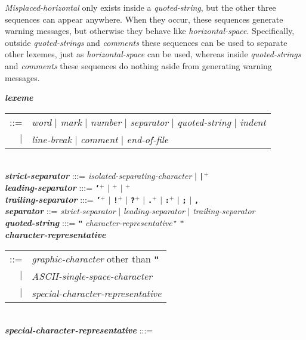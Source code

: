 \documentclass[12pt]{article}
\newcommand{\TT}[1]{{\tt \bfseries #1}}
\newcommand{\STAR}{{\Large $^\star$}}
\newcommand{\PLUS}[1][]{{$^{+#1}$}}
\newcommand{\emkey}[1]{{\em \bfseries #1}}
\newlength{\figurewidth}
\newenvironment{boxedfigure}[1][!btp]%
	{\begin{figure*}[#1]
	 \begin{lrbox}{\figurebox}
	 \begin{minipage}{\figurewidth}

	 \vspace*{1ex}}%
	{
	 \vspace*{1ex}

	 \end{minipage}
	 \end{lrbox}

	 \vspace*{-15ex}
	 \centering
	 \fbox{\hspace*{0.1in}\usebox{\figurebox}\hspace*{0.1in}}
	 \end{figure*}}
\newenvironment{indpar}[1][0.3in]%
	{\begin{list}{}%
		     {\setlength{\itemsep}{0in}%
		      \setlength{\topsep}{0in}%
		      \setlength{\parsep}{1ex}%
		      \setlength{\labelwidth}{#1}%
		      \setlength{\leftmargin}{#1}%
		      \addtolength{\leftmargin}{\labelsep}}%
	 \item}%
	{\end{list}}
\begin{document}
{\em Misplaced-horizontal} only exists inside a {\em quoted-string},
but the other three sequences can appear anywhere.  When they occur,
these sequences generate warning messages, but otherwise they behave
like {\em horizontal-space}.  Specifically, outside {\em quoted-strings}
and {\em comments} these sequences can be used to separate other lexemes,
just as {\em horizontal-space} can be used,
whereas inside {\em quoted-strings} and
{\em comments} these sequences do nothing aside from generating
warning messages.

\begin{boxedfigure}[!p]
\begin{indpar}

\emkey{lexeme}
        \begin{tabular}[t]{rl}
	::= & {\em word} $|$ {\em mark} $|$ {\em number} $|$
	      {\em separator} $|$ {\em quoted-string} $|$ {\em indent} \\
	$|$ & {\em line-break} $|$
	      {\em comment} $|$ {\em end-of-file}
	\end{tabular}
\label{LEXEME}
\\[1ex]
\emkey{strict-separator} :::= {\em isolated-separating-character} $|$
                              \TT{|}\PLUS{}
\\[0.5ex]
\emkey{leading-separator} :::=
	\TT{`}\PLUS{} $|$ 
	\TT{\textexclamdown}\PLUS{} $|$ \TT{\textquestiondown}\PLUS{}
\\[0.5ex]
\emkey{trailing-separator} :::= \TT{'}\PLUS{} $|$
				   \TT{!}\PLUS{} $|$
				   \TT{?}\PLUS{} $|$
				   \TT{.}\PLUS{} $|$
				   \TT{:}\PLUS{} $|$
				   \TT{;} $|$
				   \TT{,}
\\[0.5ex]
\emkey{separator}
    ::= {\em strict-separator} 
    $|$ {\em leading-separator}
    $|$ {\em trailing-separator}
\\[1ex]
\emkey{quoted-string}\label{QUOTED-STRING} :::=
    \TT{"} {\em character-representative}\,\STAR{} \TT{"}
\\[0.3ex]
\emkey{character-representative}\label{CHARACTER-REPRESENTATIVE}
	\begin{tabular}[t]{@{}rl@{}}
	::= & {\em graphic-character} other than \TT{"} \\
	$|$ & {\em ASCII-single-space-character} \\
	$|$ & {\em special-character-representative} \\
	\end{tabular}
\\[0.3ex]
\emkey{special-character-representative} :::= \\

\end{indpar}
\end{boxedfigure}
\end{document}
